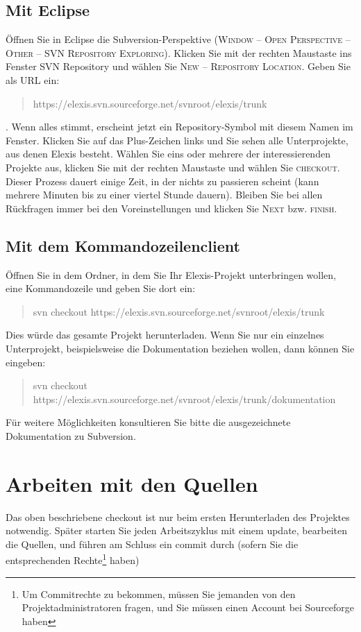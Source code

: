 \subsection{Mit Eclipse}
Öffnen Sie in Eclipse die Subversion-Perspektive (\textsc{Window -- Open
Perspective -- Other -- SVN Repository Exploring}). Klicken Sie mit der rechten
Maustaste ins Fenster \glqq SVN Repository\grqq{} und wählen Sie \textsc{New --
Repository Location}. Geben Sie als URL ein:
\begin{quote}https://elexis.svn.sourceforge.net/svnroot/elexis/trunk\end{quote}. Wenn alles stimmt, erscheint
jetzt ein Repository-Symbol mit diesem Namen im Fenster. Klicken Sie auf das
Plus-Zeichen links und Sie sehen alle Unterprojekte, aus denen Elexis besteht.
Wählen Sie eins oder mehrere der interessierenden Projekte aus, klicken Sie mit
der rechten Maustaste und wählen Sie \textsc{checkout}. Dieser Prozess dauert
einige Zeit, in der \glqq nichts\grqq{} zu passieren scheint (kann mehrere Minuten
bis zu einer viertel Stunde dauern). Bleiben Sie bei allen Rückfragen immer
bei den Voreinstellungen und klicken Sie \textsc{Next} bzw. \textsc{finish}.
\subsection{Mit dem Kommandozeilenclient}
Öffnen Sie in dem Ordner, in dem Sie Ihr Elexis-Projekt unterbringen wollen,
eine Kommandozeile und geben Sie dort ein: \begin{quote}svn checkout
https://elexis.svn.sourceforge.net/svnroot/elexis/trunk\end{quote} Dies würde das gesamte Projekt
herunterladen. Wenn Sie nur ein einzelnes Unterprojekt, beispielsweise die
Dokumentation beziehen wollen, dann können Sie eingeben: \begin{quote}svn checkout
https://elexis.svn.sourceforge.net/svnroot/elexis/trunk/dokumentation\end{quote} Für weitere
Möglichkeiten konsultieren Sie bitte die ausgezeichnete Dokumentation zu
Subversion.

\section{Arbeiten mit den Quellen}
Das oben beschriebene \glqq checkout\grqq{} ist nur beim ersten Herunterladen des
Projektes notwendig. Später starten Sie jeden Arbeitszyklus mit einem \glqq
update\grqq, bearbeiten die Quellen, und führen am Schluss ein \glqq commit\grqq{}
durch (sofern Sie die entsprechenden Rechte\footnote{Um Commitrechte zu
bekommen, müssen Sie jemanden von den Projektadministratoren fragen, und Sie
müssen einen Account bei Sourceforge haben} haben)
